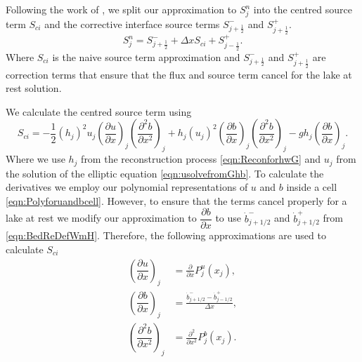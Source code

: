 Following the work of \citet{Klein-etal-2004-2050}, we split our approximation to $S^n_j$ into the centred source term $S_{ci}$ and the corrective interface source terms $S^{-}_{j + \frac{1}{2}}$ and $S^{+}_{j + \frac{1}{2}}$.
\begin{equation*}
S^n_j =  S^{-}_{j + \frac{1}{2}} + \Delta x S_{ci} + S^{+}_{j - \frac{1}{2}}.
\end{equation*}
Where $S_{ci}$ is the naive source term approximation and $S^{-}_{j + \frac{1}{2}}$ and $S^{+}_{j + \frac{1}{2}}$ are correction terms that ensure that the flux and source term cancel for the lake at rest solution. 

We calculate the centred source term using
\begin{equation*}
 S_{ci} = -\frac{1}{2}\left(h_j\right)^2 {u_j}\left( \frac{\partial {u}}{\partial x} \right)_j \left(\frac{\partial^2 b}{\partial x^2} \right)_j  + h_j \left(u_j\right)^2 \left(\frac{\partial b}{\partial x}\right)_j \left(\frac{\partial^2 b}{\partial x^2}\right)_j - gh_j\left(\frac{\partial b}{\partial x}\right)_j.
\end{equation*}
Where we use $h_j$ from the reconstruction process \eqref{eqn:ReconforhwG} and $u_j$ from the solution of the elliptic equation \eqref{eqn:usolvefromGhb}. To calculate the derivatives we employ our polynomial representations of $u$ and $b$ inside a cell \eqref{eqn:Polyforuandbcell}. However, to ensure that the terms cancel properly for a lake at rest we modify our approximation to $\dfrac{\partial b}{\partial x}$ to use $\dot{b}^-_{j+1/2}$ and $\dot{b}^+_{j+1/2}$ from \eqref{eqn:BedReDefWmH}. Therefore, the following approximations are used to calculate $S_{ci}$
\begin{subequations}
	\begin{align}
	\left(\dfrac{\partial {u}}{\partial x} \right)_{j} &= \frac{\partial }{\partial x}P^u_j(x_{j}),  \\
\left(\dfrac{\partial {b}}{\partial x} \right)_{j} &=  \frac{\dot{b}^-_{j+1/2} - \dot{b}^+_{j-1/2}}{\Delta x} , \\	
	\left(\dfrac{\partial^2 {b}}{\partial x^2} \right)_{j} &= \frac{\partial^2 }{\partial x^2}P^b_j(x_{j}).
	\end{align}
	\label{eqn:dbduReconSource}
\end{subequations}

